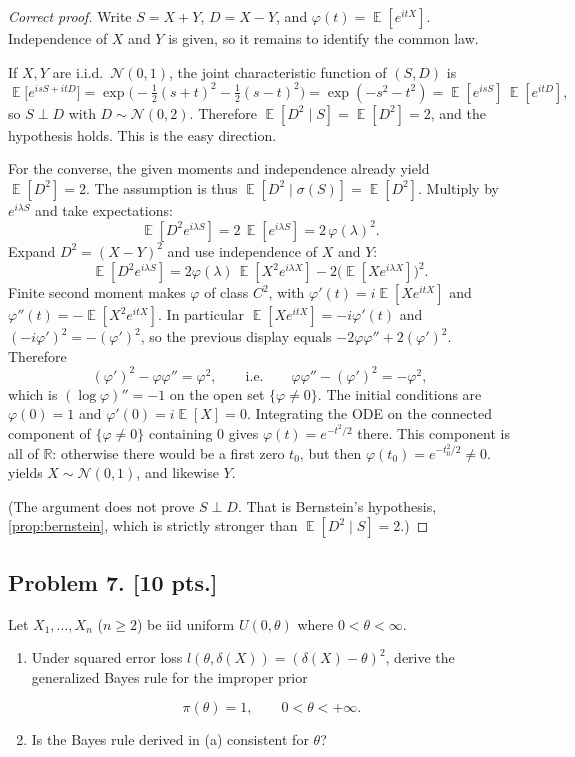 \documentclass[11pt,a4paper]{article}
\DeclareMathOperator{\E}{\mathbb{E}}
\begin{document}
\begin{proof}[Correct proof]
Write \( S=X+Y \), \( D=X-Y \), and \( \varphi(t)=\E[e^{itX}] \). Independence of \( X \) and \( Y \) is given, so it remains to identify the common law.

If \( X,Y \) are i.i.d.\ \( \mathcal{N}(0,1) \), the joint characteristic function of \( (S,D) \) is
\[
\E\bigl[e^{isS+itD}\bigr]
=
\exp\bigl(-\tfrac12(s+t)^{2}-\tfrac12(s-t)^{2}\bigr)
=
\exp(-s^{2}-t^{2})
=
\E[e^{isS}]\,\E[e^{itD}],
\]
so \( S\perp D \) with \( D\sim\mathcal{N}(0,2) \). Therefore \( \E[D^{2}\mid S]=\E[D^{2}]=2 \), and the hypothesis holds. This is the easy direction.

For the converse, the given moments and independence already yield \( \E[D^{2}]=2 \). The assumption is thus \( \E[D^{2}\mid\sigma(S)]=\E[D^{2}] \). Multiply by \( e^{i\lambda S} \) and take expectations:
\[
\E[D^{2}e^{i\lambda S}]
=
2\,\E[e^{i\lambda S}]
=
2\,\varphi(\lambda)^{2}.
\]
Expand \( D^{2}=(X-Y)^{2} \) and use independence of \( X \) and \( Y \):
\[
\E[D^{2}e^{i\lambda S}]
=
2\varphi(\lambda)\,\E[X^{2}e^{i\lambda X}]
-
2\bigl(\E[Xe^{i\lambda X}]\bigr)^{2}.
\]
Finite second moment makes \( \varphi \) of class \( C^{2} \), with \( \varphi'(t)=i\E[Xe^{itX}] \) and \( \varphi''(t)=-\E[X^{2}e^{itX}] \). In particular \( \E[Xe^{itX}]=-i\varphi'(t) \) and \( (-i\varphi')^{2}=-(\varphi')^{2} \), so the previous display equals \( -2\varphi\varphi''+2(\varphi')^{2} \). Therefore
\[
(\varphi')^{2}-\varphi\varphi''
=
\varphi^{2},
\qquad\text{i.e.}\qquad
\varphi\varphi''-(\varphi')^{2}
=
-\varphi^{2},
\]
which is \( (\log\varphi)''=-1 \) on the open set \( \{\varphi\neq 0\} \). The initial conditions are \( \varphi(0)=1 \) and \( \varphi'(0)=i\E[X]=0 \). Integrating the ODE on the connected component of \( \{\varphi\neq 0\} \) containing \( 0 \) gives \( \varphi(t)=e^{-t^{2}/2} \) there. This component is all of \( \mathbb{R} \): otherwise there would be a first zero \( t_0 \), but then \( \varphi(t_0)=e^{-t_0^{2}/2}\neq 0 \).  yields \( X\sim\mathcal{N}(0,1) \), and likewise \( Y \).

(The argument does not prove \( S\perp D \). That is Bernstein's hypothesis, \cref{prop:bernstein}, which is strictly stronger than \( \E[D^{2}\mid S]=2 \).)
\end{proof}

\subsection{Problem 7. [10 pts.]}
Let \( X_1, \dots, X_n \) (\( n \ge 2 \)) be iid uniform \( U(0, \theta) \) where \( 0 < \theta < \infty \).
\begin{enumerate}[label=(\alph*)]
    \item Under squared error loss \( l(\theta, \delta(X)) = (\delta(X) - \theta)^2 \), derive the generalized Bayes rule for the improper prior

    \[
    \pi(\theta) = 1, \qquad 0 < \theta < +\infty.
    \]
    \item Is the Bayes rule derived in (a) consistent for \( \theta \)?
\end{enumerate}
\end{document}
